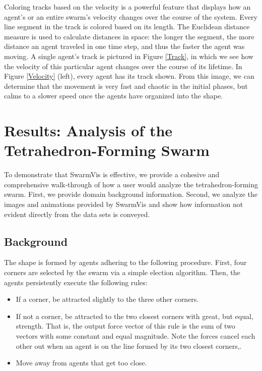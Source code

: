 \documentclass{vgtc}
\begin{document}
Coloring tracks based on the velocity is a powerful feature that displays how an agent's or an entire swarm's
velocity changes over the course of the system.
Every line segment in the track is colored based on its length. The Euclidean distance measure is used to calculate distances in space: the longer the segment, the more distance an agent traveled in one time step,
and thus the faster the agent was moving.
A single agent's track is pictured in Figure \ref{Track}, in which we see how the velocity of this particular agent changes over the course of its lifetime.
In Figure \ref{Velocity} (left), every agent has its track shown.
From this image, we can determine that the movement is very fast and chaotic in the initial phases, but calms to a slower speed once the agents have organized into the shape.

\section{Results: Analysis of the Tetrahedron-Forming Swarm}

To demonstrate that SwarmVis is effective,
we provide a cohesive and comprehensive walk-through of how a user would
analyze the tetrahedron-forming swarm. First, we provide domain background information.
Second, we analyze the images and animations provided by SwarmVis and show how information not evident directly from the data sets is conveyed.

\subsection{Background}

The shape is formed by agents adhering to the following procedure.
First, four corners are selected by the swarm via a simple election algorithm.
Then, the agents persistently execute the following rules:
\begin{itemize}
	\item If a corner, be attracted slightly to the three other corners.
	\item If not a corner, be attracted to the two closest corners with great, but equal, strength.
	That is, the output force vector of this rule is the sum of two vectors with some constant and equal magnitude.
	Note the forces cancel each other out when an agent is on the line formed by its two closest corners,.
	\item Move away from agents that get too close.
\end{itemize}
\end{document}
